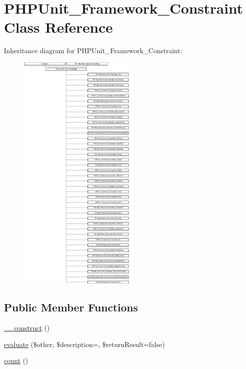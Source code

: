 \hypertarget{class_p_h_p_unit___framework___constraint}{}\section{P\+H\+P\+Unit\+\_\+\+Framework\+\_\+\+Constraint Class Reference}
\label{class_p_h_p_unit___framework___constraint}
Inheritance diagram for P\+H\+P\+Unit\+\_\+\+Framework\+\_\+\+Constraint\+:\begin{figure}[H]
\begin{center}
\leavevmode
\includegraphics[height=12.000000cm]{class_p_h_p_unit___framework___constraint}
\end{center}
\end{figure}
\subsection*{Public Member Functions}
\begin{DoxyCompactItemize}
\item 
\mbox{\hyperlink{class_p_h_p_unit___framework___constraint_a095c5d389db211932136b53f25f39685}{\+\_\+\+\_\+construct}} ()
\item 
\mbox{\hyperlink{class_p_h_p_unit___framework___constraint_a4c184790087f7d42c3daf0d0180fe5fb}{evaluate}} (\$other, \$description=\textquotesingle{}\textquotesingle{}, \$return\+Result=false)
\item 
\mbox{\hyperlink{class_p_h_p_unit___framework___constraint_ac751e87b3d4c4bf2feb03bee8b092755}{count}} ()
\end{DoxyCompactItemize}
